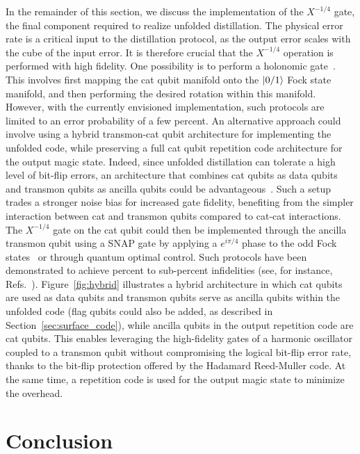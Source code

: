 \documentclass[%
 reprint,
superscriptaddress,
 amsmath,amssymb,
 aps,
]{revtex4-2}
\begin{document}
In the remainder of this section, we discuss the implementation of the $X^{-1/4}$ gate, the final component required to realize unfolded distillation. The physical error rate is a critical input to the distillation protocol, as the output error scales with the cube of the input error. It is therefore crucial that the $X^{-1/4}$ operation is performed with high fidelity. One possibility is to perform a holonomic gate~\cite{albert2016holonomic}. This involves first mapping the cat qubit manifold onto the $\ket{0/1}$ Fock state manifold, and then performing the desired rotation within this manifold. However, with the currently envisioned implementation, such protocols are limited to an error probability of a few percent. An alternative approach could involve using a hybrid transmon-cat qubit architecture for implementing the unfolded code, while preserving a full cat qubit repetition code architecture for the output magic state. Indeed, since unfolded distillation can tolerate a high level of bit-flip errors, an architecture that combines cat qubits as data qubits and transmon qubits as ancilla qubits could be advantageous~\cite{hann2024hybrid, putterman2025hardware}. Such a setup trades a stronger noise bias for increased gate fidelity, benefiting from the simpler interaction between cat and transmon qubits compared to cat-cat interactions. The $X^{-1/4}$ gate on the cat qubit could then be implemented through the ancilla transmon qubit using a SNAP gate by applying a $e^{i \pi/4}$ phase to the odd Fock states~\cite{heeres2015cavity, krastanov2015universal} or through quantum optimal control. Such protocols have been demonstrated to achieve percent to sub-percent infidelities (see, for instance, Refs.~\cite{ heeres2017implementing, eickbusch2022fast, mehta2025bias}). Figure~\ref{fig:hybrid} illustrates a hybrid architecture in which cat qubits are used as data qubits and transmon qubits serve as ancilla qubits within the unfolded code (flag qubits could also be added, as described in Section~\ref{sec:surface_code}), while ancilla qubits in the output repetition code are cat qubits. This enables leveraging the high-fidelity gates of a harmonic oscillator coupled to a transmon qubit without compromising the logical bit-flip error rate, thanks to the bit-flip protection offered by the Hadamard Reed-Muller code. At the same time, a repetition code is used for the output magic state to minimize the overhead.

\section{Conclusion}
\end{document}
